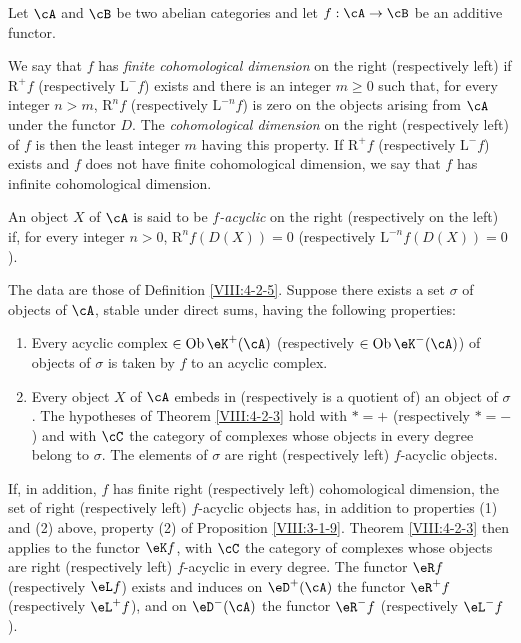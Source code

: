 \begin{definition}\label{VIII:4-2-5} %
Let $\cA$ and $\cB$ be two abelian categories and let $f:\cA\to \cB$ be
an additive functor.

We say that $f$ has \emph{finite cohomological dimension} on the right
(respectively left) if $\mathrm{R}^+ f$ (respectively $\mathrm{L}^- f$)
exists and there is an integer $m\geqslant 0$ such that, for every integer
$n>m$, $\mathrm{R}^n f$ (respectively $\mathrm{L}^{-n} f$) is zero on the objects
arising from $\cA$ under the functor $D$. The
\emph{cohomological dimension} on the right (respectively left) of $f$ is then the
least integer $m$ having this property. If $\mathrm{R}^+ f$ (respectively
$\mathrm{L}^- f$) exists and $f$ does not have finite cohomological dimension,
we say that $f$ has infinite cohomological dimension.

An object $X$ of $\cA$ is said to be \emph{$f$-acyclic} on the right
(respectively on the left) if, for every integer $n>0$,
$\mathrm{R}^n f(D(X)) = 0$ (respectively $\mathrm{L}^{-n} f(D(X))=0$).
\end{definition}

\begin{corollary}\label{VIII:4-2-3-2} %
The data are those of Definition \ref{VIII:4-2-5}. Suppose there exists a
set $\sigma$ of objects of $\cA$, stable under direct sums, having the
following properties:
\begin{enumerate}
  \item Every acyclic complex
    $\in \operatorname{Ob}{\eK^+(\cA)}$ (respectively
    $\in\operatorname{Ob}{\eK^-(\cA)}$) of objects of $\sigma$ is taken by
    $f$ to an acyclic complex.
  \item Every object $X$ of $\cA$ embeds in (respectively is a quotient of)
    an object of $\sigma$. The hypotheses of Theorem \ref{VIII:4-2-3}
    hold with $\ast=+$ (respectively $\ast=-$) and with $\cC$ the category
    of complexes whose objects in every degree belong to $\sigma$. The
    elements of $\sigma$ are right (respectively left) $f$-acyclic
    objects.
\end{enumerate}

If, in addition, $f$ has finite right (respectively left) cohomological
dimension, the set of right (respectively left) $f$-acyclic objects has,
in addition to properties (1) and (2) above, property (2) of Proposition
\ref{VIII:3-1-9}. Theorem \ref{VIII:4-2-3} then applies to the functor
$\eK f$, with $\cC$ the category of complexes whose objects are right
(respectively left) $f$-acyclic in every degree. The functor $\eR f$
(respectively $\eL f$) exists and induces on $\eD^+(\cA)$ the functor
$\eR^+ f$ (respectively $\eL^+ f$), and on $\eD^-(\cA)$ the functor
$\eR^- f$ (respectively $\eL^- f$).
\end{corollary}

